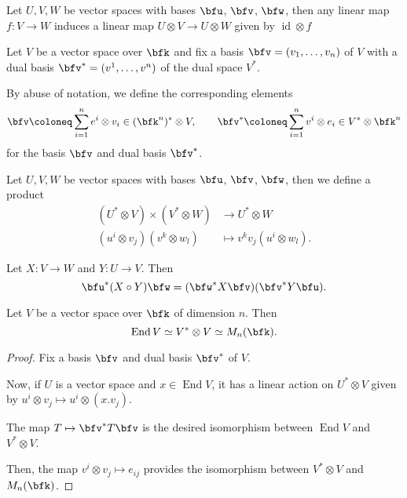 \documentclass{article}
\DeclareMathOperator{\End}{End}
\DeclareMathOperator{\id}{id}
\newcommand*\acts{.}
\begin{document}
\begin{definition}
    Let $U, V, W$ be vector spaces with bases $\bfu$, $\bfv$, $\bfw$, then any linear map $f: V \to W$ induces a linear map $U \otimes V \to U \otimes W$ given by $\id \otimes f$
\end{definition}

\begin{definition}
    Let $V$ be a vector space over $\bfk$ and fix a basis $\bfv = (v_1,\ldots,v_n)$ of $V$ with a dual basis $\bfv^\ast = (v^1, \ldots, v^n)$ of the dual space $V^\ast$.

    By abuse of notation, we define the corresponding elements
    \[
        \bfv 
        \coloneq 
        \sum_{i=1}^n 
        e^i \otimes v_i 
        \in (\bfk^n)^\ast \otimes V
        ,\qquad
        \bfv^\ast 
        \coloneq 
        \sum_{i=1}^n v^i \otimes e_i 
        \in V^\ast \otimes \bfk^n
    \]
    for the basis $\bfv$ and dual basis $\bfv^\ast$.
\end{definition}

\begin{definition}
    Let $U, V, W$ be vector spaces with bases $\bfu$, $\bfv$, $\bfw$, then we define a product
    \begin{align*}
        (U^\ast \otimes V) \times (V^\ast \otimes W)
        &\to
        U^\ast \otimes W
        \\
        (u^i \otimes v_j)(v^k \otimes w_l)
        &\mapsto
        v^kv_j
        (u^i \otimes w_l).
    \end{align*}
\end{definition}

\begin{theorem}
    Let $X: V \to W$ and $Y: U \to V$.
    Then 
    \[
        \bfu^\ast(X \circ Y)\bfw
        =
        (\bfw^\ast X \bfv)(\bfv^\ast Y \bfu).
    \]
\end{theorem}

\begin{theorem}
    Let $V$ be a vector space over $\bfk$ of dimension $n$.
    Then
    \[
        \End V
        \simeq
        V^\ast \otimes V
        \simeq
        M_n(\bfk).
    \]
\end{theorem}

\begin{proof}
    Fix a basis $\bfv$ and dual basis $\bfv^\ast$ of $V$.

    Now, if $U$ is a vector space and $x \in \End V$, it has a linear action on $U^\ast \otimes V$ given by $u^i \otimes v_j \mapsto u^i \otimes (x \acts v_j)$.

    The map $T \mapsto \bfv^\ast T \bfv$ is the desired isomorphism between $\End V$ and $V^\ast \otimes V$.

    Then, the map $v^i \otimes v_j \mapsto e_{ij}$ provides the isomorphism between $V^\ast \otimes V$ and $M_n(\bfk)$.
\end{proof}
\end{document}
